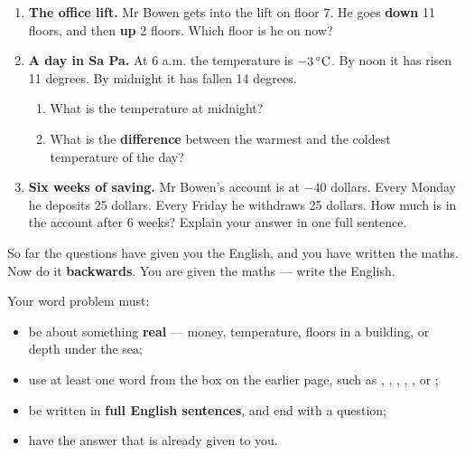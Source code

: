 \documentclass[12pt,a4paper]{article}
\begin{document}
\begin{enumerate}[label=\textbf{\arabic*.}, itemsep=16pt]

  \item \textbf{The office lift.} Mr Bowen gets into the lift on floor 7. He goes
        \textbf{down} 11 floors, and then \textbf{up} 2 floors. Which floor is he on
        now?
        \begin{workspace}[2.8cm]\end{workspace}

  \item \textbf{A day in Sa Pa.} At 6 a.m. the temperature is $-3\,^{\circ}\mathrm{C}$. By noon it has
        risen 11 degrees. By midnight it has fallen 14 degrees.
        \begin{enumerate}[label=(\alph*)]
          \item What is the temperature at midnight?
          \item What is the \textbf{difference} between the warmest and the coldest
                temperature of the day?
        \end{enumerate}
        \begin{workspace}[3.4cm]\end{workspace}

  \item \textbf{Six weeks of saving.} Mr Bowen's account is at $-40$ dollars. Every
        Monday he deposits 25 dollars. Every Friday he withdraws 25 dollars. How much is
        in the account after 6 weeks? Explain your answer in one full sentence.
        \begin{workspace}[3.1cm]\end{workspace}

\end{enumerate}


\begin{yourturn}
  So far the questions have given you the English, and you have written the maths.
  Now do it \textbf{backwards}. You are given the maths --- write the English.

  \medskip
  Your word problem must:
  \begin{itemize}
    \item be about something \textbf{real} --- money, temperature, floors in a
          building, or depth under the sea;
    \item use at least one word from the  box on the earlier page,
          such as , , , ,
          ,  or ;
    \item be written in \textbf{full English sentences}, and end with a question;
    \item have the answer that is already given to you.
  \end{itemize}
\end{yourturn}
\end{document}
